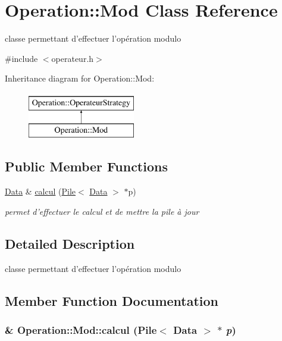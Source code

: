 \hypertarget{classOperation_1_1Mod}{
\section{Operation::Mod Class Reference}
\label{classOperation_1_1Mod}
}


classe permettant d'effectuer l'opération modulo  




{\ttfamily \#include $<$operateur.h$>$}

Inheritance diagram for Operation::Mod:\begin{figure}[H]
\begin{center}
\leavevmode
\includegraphics[height=2cm]{classOperation_1_1Mod}
\end{center}
\end{figure}
\subsection*{Public Member Functions}
\begin{DoxyCompactItemize}
\item 
\hyperlink{classNombre_1_1Data}{Data} \& \hyperlink{classOperation_1_1Mod_a2d9e1194e85a07b4f70defbb4dec64d2}{calcul} (\hyperlink{classPile}{Pile}$<$ \hyperlink{classNombre_1_1Data}{Data} $>$ $\ast$p)
\begin{DoxyCompactList}\small\item\em permet d'effectuer le calcul et de mettre la pile à jour \item\end{DoxyCompactList}\end{DoxyCompactItemize}


\subsection{Detailed Description}
classe permettant d'effectuer l'opération modulo 

\subsection{Member Function Documentation}
\hypertarget{classOperation_1_1Mod_a2d9e1194e85a07b4f70defbb4dec64d2}{
\subsubsection[{calcul}]{\& Operation::Mod::calcul ({\bf Pile}$<$ {\bf Data} $>$ $\ast$ {\em p})}}
\label{classOperation_1_1Mod_a2d9e1194e85a07b4f70defbb4dec64d2}


